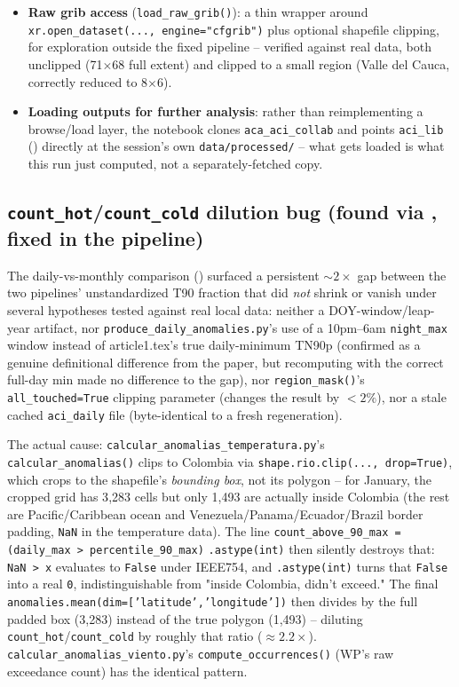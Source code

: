 \documentclass[11pt]{article}
\begin{document}
\begin{itemize}[leftmargin=*]
\item \textbf{Raw grib access} (\texttt{load\_raw\_grib()}): a thin
  wrapper around \texttt{xr.open\_dataset(..., engine="cfgrib")} plus
  optional shapefile clipping, for exploration outside the fixed
  pipeline -- verified against real data, both unclipped (71$\times$68
  full extent) and clipped to a small region (Valle del Cauca, correctly
  reduced to 8$\times$6).
\item \textbf{Loading outputs for further analysis}: rather than
  reimplementing a browse/load layer, the notebook clones
  \texttt{aca\_aci\_collab} and points \texttt{aci\_lib}
  () directly at the session's own
  \texttt{data/processed/} -- what gets loaded is what this run just
  computed, not a separately-fetched copy.
\end{itemize}

\subsection{\texttt{count\_hot}/\texttt{count\_cold} dilution bug (found
via , fixed in the pipeline)}
\label{sec:count-hot-dilution}

The daily-vs-monthly comparison () surfaced a
persistent $\sim2\times$ gap between the two pipelines' unstandardized T90
fraction that did \emph{not} shrink or vanish under several hypotheses
tested against real local data: neither a DOY-window/leap-year artifact,
nor \texttt{produce\_daily\_anomalies.py}'s use of a 10pm--6am
\texttt{night\_max} window instead of article1.tex's true daily-minimum
TN90p (confirmed as a genuine definitional difference from the paper, but
recomputing with the correct full-day min made no difference to the gap),
nor \texttt{region\_mask()}'s \texttt{all\_touched=True} clipping parameter
(changes the result by $<2\%$), nor a stale cached \texttt{aci\_daily}
file (byte-identical to a fresh regeneration).

The actual cause: \texttt{calcular\_anomalias\_temperatura.py}'s
\texttt{calcular\_anomalias()} clips to Colombia via
\texttt{shape.rio.clip(..., drop=True)}, which crops to the shapefile's
\emph{bounding box}, not its polygon -- for January, the cropped grid has
3{,}283 cells but only 1{,}493 are actually inside Colombia (the rest are
Pacific/Caribbean ocean and Venezuela/Panama/Ecuador/Brazil border padding,
\texttt{NaN} in the temperature data). The line
\texttt{count\_above\_90\_max = (daily\_max > percentile\_90\_max)}
\texttt{.astype(int)} then silently destroys that: \texttt{NaN > x}
evaluates to \texttt{False} under IEEE754, and \texttt{.astype(int)} turns
that \texttt{False} into a real \texttt{0}, indistinguishable from "inside
Colombia, didn't exceed." The final
\texttt{anomalies.mean(dim=['latitude','longitude'])} then divides by the
full padded box (3{,}283) instead of the true polygon (1{,}493) --
diluting \texttt{count\_hot}/\texttt{count\_cold} by roughly that ratio
($\approx 2.2\times$). \texttt{calcular\_anomalias\_viento.py}'s
\texttt{compute\_occurrences()} (WP's raw exceedance count) has the
identical pattern.
\end{document}
